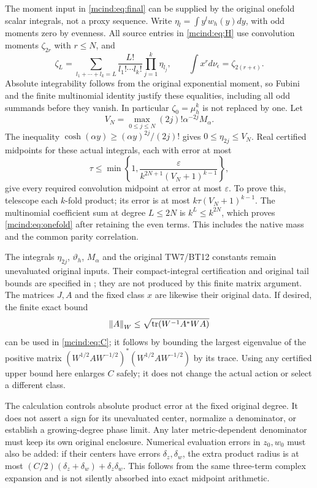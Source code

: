 The moment input in \eqref{mcind:eq:final} can be supplied by the
original onefold scalar integrals, not a proxy sequence. Write
$\eta_l=\int y^lw_h(y)dy$, with odd moments zero by evenness.
All source entries in \eqref{mcind:eq:H} use convolution moments
$\zeta_{2r}$ with $r\le N$, and
\[
 \zeta_L=\sum_{l_1+\cdots+l_k=L}
             \frac{L!}{l_1!\cdots l_k!}\prod_{j=1}^k\eta_{l_j},
 \qquad \int x^r d\nu_\epsilon=\zeta_{2(r+\epsilon)}.
\]
Absolute integrability follows from the original exponential
moment, so Fubini and the finite multinomial identity justify
these equalities, including all odd summands before they vanish.
In particular $\zeta_0=\mu_h^k$ is not replaced by one.
Let
\[
 V_N=\max_{0\le j\le N}(2j)!\alpha^{-2j}M_\alpha.
\]
The inequality $\cosh(\alpha y)\ge(\alpha y)^{2j}/(2j)!$
gives $0\le\eta_{2j}\le V_N$. Real certified midpoints for
these actual integrals, each with error at most
\begin{equation}\tag{MC16}\label{mcind:eq:onefold}
 \tau\le\min\left\{1,
         \frac{\varepsilon}{k^{2N+1}(V_N+1)^{k-1}}\right\},
\end{equation}
give every required convolution midpoint at error at most
$\varepsilon$. To prove this, telescope each $k$-fold product;
its error is at most $k\tau(V_N+1)^{k-1}$. The multinomial
coefficient sum at degree $L\le2N$ is $k^L\le k^{2N}$,
which proves \eqref{mcind:eq:onefold} after retaining the even terms.
This includes the native mass and the common parity correlation.

The integrals $\eta_{2j}$, $\vartheta_h$, $M_\alpha$ and the
original TW7/BT12 constants remain unevaluated original inputs.
Their compact-integral certification and original tail bounds
are specified in \cite{mcind:NP}; they are not produced by this finite
matrix argument. The matrices $J,A$ and the fixed class $x$ are
likewise their original data. If desired, the finite exact bound
\[
 \left\lVert A\right\rVert_W\le\sqrt{\operatorname{tr}(W^{-1}A^*WA)}
\]
can be used in \eqref{mcind:eq:C}; it follows by bounding the largest
eigenvalue of the positive matrix
$(W^{1/2}AW^{-1/2})^*(W^{1/2}AW^{-1/2})$ by its trace.
Using any certified upper bound here enlarges $C$ safely; it does
not change the actual action or select a different class.

The calculation controls absolute product error at the fixed
original degree. It does not assert a sign for its unevaluated
center, normalize a denominator, or establish a growing-degree
phase limit. Any later metric-dependent denominator must keep its
own original enclosure. Numerical evaluation errors in $z_0,w_0$
must also be added: if their centers have errors $\delta_z,
\delta_w$, the extra product radius is at most
$(C/2)(\delta_z+\delta_w)+\delta_z\delta_w$. This follows
from the same three-term complex expansion and is not silently
absorbed into exact midpoint arithmetic.

